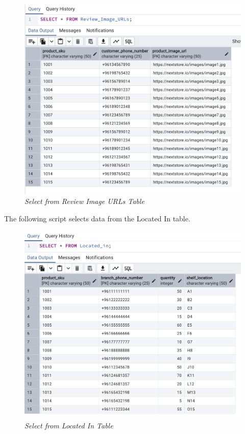 \begin{figure}[H]
  \centering
  \includegraphics[width=1\textwidth]{images/sql/select/review_image_urls.png}
  \caption{\textit{Select from Review Image URLs Table}}
\end{figure}

The following script selects data from the Located In table.


\begin{figure}[H]
  \centering
  \includegraphics[width=1\textwidth]{images/sql/select/located_in.png}
  \caption{\textit{Select from Located In Table}}
\end{figure}

